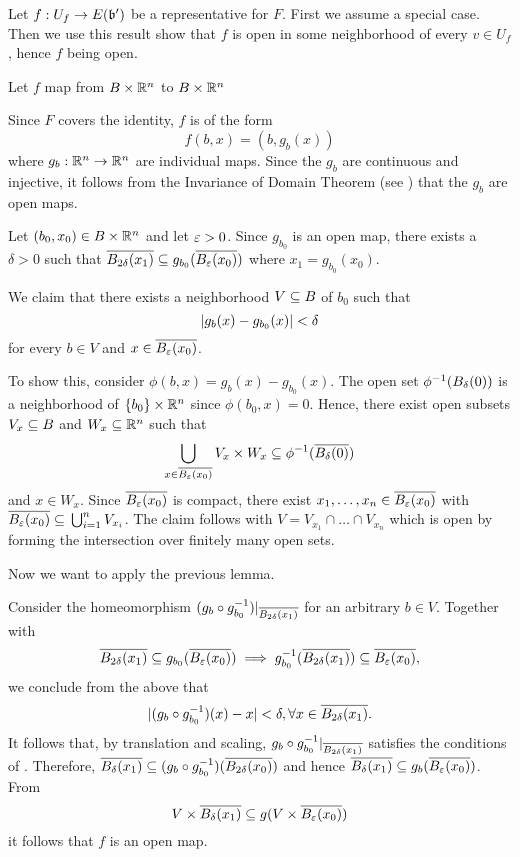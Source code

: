 \begin{myproof} Let $f: U_f \to E(\bb')$ be a representative for $F$. First we assume a special case. Then we use this result show that $f$ is open in some neighborhood of every $v \in U_f$, hence $f$ being open. \begin{steps} \item Let $f$ map from $B \times \mathbb{R}^n$ to $B \times \mathbb{R}^n$

Since $F$ covers the identity, $f$ is of the form \[ f(b, x) = (b, g_b(x)) \] where $g_b: \mathbb{R}^n \to \mathbb{R}^n$ are individual maps. Since the $g_b$ are continuous and injective, it follows from the Invariance of Domain Theorem (see \cite[cor.19.9]{brendon}) that the $g_b$ are open maps.

Let $(b_0, x_0) \in B \times \mathbb{R}^n$ and let $\varepsilon{} > 0$. Since $g_{b_0}$ is an open map, there exists a $\delta > 0$ such that $\clball[2\delta][x_1] \sub g_{b_0}(\clball[\eps][x_0])$ where $x_1 = g_{b_0}(x_0)$.

We claim that there exists a neighborhood $V \subseteq{} B$ of $b_0$ such that \[ \vert{} g_b(x) - g_{b_0}(x) \vert{} < \delta \] for every $b \in V$ and $x \in \clball[\eps][x_0]$.

To show this, consider $\phi(b, x) = g_b(x) - g_{b_0}(x)$. The open set $\inv{\phi}(\ball[\delta])$ is a neighborhood of $\{b_0\} \times \mathbb{R}^n$ since $\phi(b_0, x) = 0$. Hence, there exist open subsets $V_x \subseteq{} B$ and $W_x \subseteq{} \mathbb{R}^n$ such that \[ \bigcup_{x \in \clball[\eps][x_0]} V_x \cross W_x \sub \inv{\phi}(\clball[\delta]) \] and $x \in W_x$. Since $\clball[\eps][x_0]$ is compact, there exist $x_1, \dots, x_n \in \clball[\eps][x_0]$ with $\clball[\eps][x_0] \sub \bigcup_{i = 1}^{n} V_{x_i}$. The claim follows with $V = V_{x_1} \cap \dots \cap V_{x_n}$ which is open by forming the intersection over finitely many open sets.

Now we want to apply the previous lemma.

Consider the homeomorphism $(g_b \circ \inv{g_{b_0}})\restr{\clball[2\delta][x_1]}$ for an arbitrary $b \in V$. Together with \[ \clball[2\delta][x_1] \sub g_{b_0}(\clball[\eps][x_0]) \implies \inv{g_{b_0}}(\clball[2\delta][x_1]) \sub \clball[\eps][x_0], \] we conclude from the above that \[ \abs{(g_b \circ \inv{g_{b_0}})(x) - x} < \delta, \forall x \in \clball[2\delta][x_1]. \] It follows that, by translation and scaling, $g_b \circ \inv{g_{b_0}}\restr{\clball[2\delta][x_1]}$ satisfies the conditions of . Therefore, $\clball[\delta][x_1] \sub (g_b \circ \inv{g_{b_0}})(\clball[2\delta][x_0])$ and hence $\clball[\delta][x_1] \sub g_b(\clball[\eps][x_0])$. From \[ V \cross \clball[\delta][x_1] \sub g(V \cross \clball[\eps][x_0]) \] it follows that $f$ is an open map.


\end{steps}
\end{myproof}
